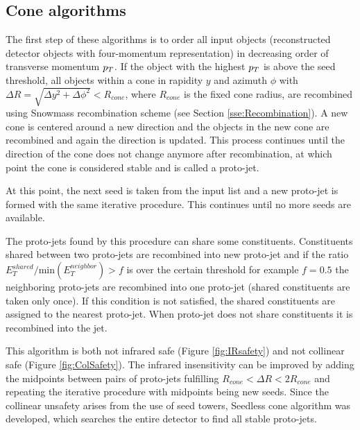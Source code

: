 \subsection{Cone algorithms}

The first step of these algorithms is to order all input objects (reconstructed
detector objects with four-momentum representation) in decreasing order of
transverse momentum $p_{T}$. If the object with the highest $p_{T}$ is above the
seed threshold, all objects within a cone in rapidity $y$ and azimuth
$\phi$ with $\Delta R = \sqrt{\Delta y^2 + \Delta \phi^2} < R_{cone}$, where
$R_{cone}$ is the fixed cone radius, are recombined using Snowmass recombination
scheme (see Section \ref{sse:Recombination}).  A new cone is centered around a
new direction and the objects in the new cone are recombined and again the
direction is updated. This process continues until the direction of the cone
does not change anymore after recombination, at which point the cone is
considered stable and is called a proto-jet. 

At this point, the next seed is taken from the input list and a new proto-jet is
formed with the same iterative procedure. This continues until no more seeds are
available. 

The proto-jets found by this procedure can share some constituents. Constituents
shared between two proto-jets are recombined into new proto-jet and if the ratio
$E_T^{shared} / \text{min} ( E_T^{neighbor} ) > f$ is over the certain threshold
for example 
$f = 0.5$ the neighboring proto-jets are recombined into one proto-jet (shared
constituents are taken only once). If this condition is not satisfied, the
shared constituents are assigned to the nearest proto-jet. When proto-jet does
not share constituents it is recombined into the jet.

This algorithm is both not infrared safe (Figure \ref{fig:IRsafety}) and not
collinear safe (Figure \ref{fig:ColSafety}). The infrared insensitivity can be
improved by adding the midpoints between pairs of proto-jets fulfilling
$R_{cone} < \Delta R < 2 R_{cone}$ and repeating the iterative procedure with
midpoints being new seeds. Since the collinear unsafety arises from the use of
seed towers, Seedless cone algorithm was developed, which searches the entire
detector to find all stable proto-jets.

